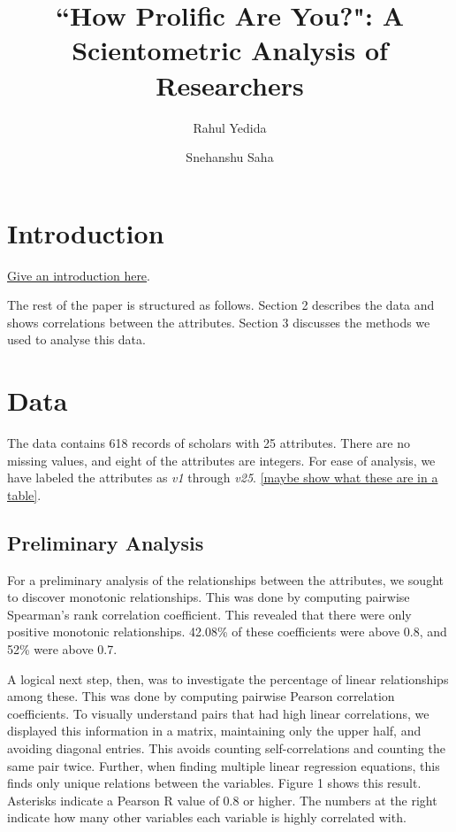 \documentclass[12pt,a4paper,twocolumn]{article}
\title{``How Prolific Are You?": A Scientometric Analysis of Researchers}
\author[1]{Rahul Yedida}
\author[1]{Snehanshu Saha}
\affil[1]{Department of Computer Science \& Engineering, PESIT South Campus}
\date{}
\begin{document}
\maketitle


\section{Introduction}
\underline{Give an introduction here}. 

The rest of the paper is structured as follows. Section 2 describes the data and shows correlations between the attributes. Section 3 discusses the methods we used to analyse this data.

\section{Data}
The data contains 618 records of scholars with 25 attributes. There are no missing values, and eight of the attributes are integers. For ease of analysis, we have labeled the attributes as \textit{v1} through \textit{v25}. \underline{[maybe show what these are in a table]}.

\subsection{Preliminary Analysis}
For a preliminary analysis of the relationships between the attributes, we sought to discover monotonic relationships. This was done by computing pairwise Spearman's rank correlation coefficient. This revealed that there were only positive monotonic relationships. 42.08\% of these coefficients were above 0.8, and 52\% were above 0.7.

A logical next step, then, was to investigate the percentage of linear relationships among these. This was done by computing pairwise Pearson correlation coefficients. To visually understand pairs that had high linear correlations, we displayed this information in a matrix, maintaining only the upper half, and avoiding diagonal entries. This avoids counting self-correlations and counting the same pair twice. Further, when finding multiple linear regression equations, this finds only unique relations between the variables. Figure 1 shows this result. Asterisks indicate a Pearson R value of 0.8 or higher. The numbers at the right indicate how many other variables each variable is highly correlated with. \\
\end{document}
